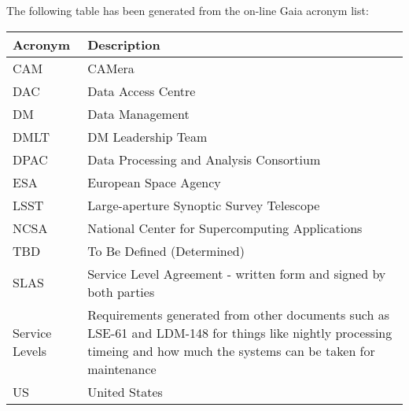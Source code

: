 The following table has been generated from the on-line Gaia acronym list:
\newline\newline%
\addtocounter{table}{-1}
\begin{longtable}{|l|p{}|}\hline
\textbf{Acronym} & \textbf{Description}  \\\hline
CAM&CAMera \\\hline
DAC&Data Access Centre \\\hline
DM&Data Management \\\hline
DMLT&DM Leadership Team \\\hline
DPAC&Data Processing and Analysis Consortium \\\hline
ESA&European Space Agency \\\hline
LSST&Large-aperture Synoptic Survey Telescope \\\hline
NCSA&National Center for Supercomputing Applications \\\hline
TBD&To Be Defined (Determined) \\\hline
SLAS&Service Level Agreement - written form and signed by both parties \\\hline
Service Levels&Requirements generated from other documents such as LSE-61 and LDM-148 for things like nightly processing timeing and how much the systems can be taken for maintenance\\\hline
US&United States \\\hline
\end{longtable}
